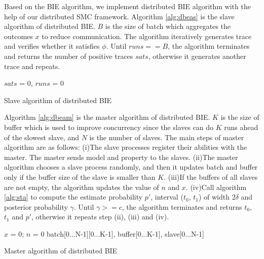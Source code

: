 Based on the BIE algorithm, we implement distributed BIE algorithm with the help of our distributed SMC framework. Algorithm \ref{alg:dbeas} is the slave algorithm of distributed BIE. $B$ is the size of batch which aggregates the outcomes $x$ to reduce communication. The algorithm iteratively generates trace and verifies whether it satisfies $\phi$. Until $runs == B$, the algorithm terminates and returns the number of positive traces $sats$, otherwise it generates another trace and repeats.
\begin{algorithm}[t]
{}
$sats$ = 0, $runs$ = 0\;
\caption{Slave algorithm of distributed BIE}
\label{alg:dbeas}
\end{algorithm}
Algorithm \ref{alg:dbeam} is the master algorithm of distributed BIE. \emph{$K$} is the size of buffer which is used to improve concurrency since the slaves can do \emph{$K$} runs ahead of the slowest slave, and \emph{$N$} is the number of slaves. The main steps of master algorithm are as follows: (i)The slave processes register their abilities with the master. The master sends model and property to the slaves. (ii)The master algorithm chooses a slave process randomly, and then it updates batch and buffer only if the buffer size of the slave is smaller than \emph{$K$}. (iii)If the buffers of all slaves are not empty, the algorithm updates the value of \emph{$n$} and \emph{$x$}. (iv)Call algorithm \ref{alg:sta} to compute the estimate probability $p'$, interval ($t_0$, $t_1$) of width 2$\delta$ and posterior probability $\gamma$. Until $\gamma >= c$, the algorithm terminates and returns $t_0$, $t_1$ and $p'$, otherwise it repeats step (ii), (iii) and (iv).
\begin{algorithm}[t]
{}
$x$ = 0; $n$ = 0\;
batch[0...N-1][0...K-1], buffer[0...K-1], slave[0...N-1]\;
\caption{Master algorithm of distributed BIE}
\label{alg:dbeam}
\end{algorithm}
